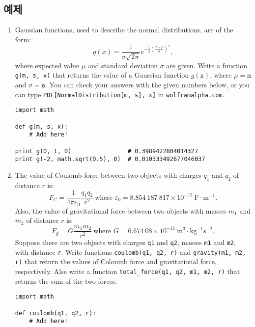\documentclass[../main.tex]{subfiles}
\begin{document}
\subsection{예제}
\begin{enumerate}
\item Gaussian functions, used to describe the normal distributions, are of the form:
\[
g(x) = \frac{1}{\sigma \sqrt{2\pi}} e^{-\frac12 \left(\frac{x - \mu}{\sigma}\right)^2},
\]
where expected value $\mu$ and standard deviation $\sigma$ are given.
Write a function \texttt{g(m, s, x)} that returns the value of a Gaussian function $g(\texttt{x})$, where $\mu = \texttt{m}$ and $\sigma = \texttt{s}$.
You can check your answers with the given numbers below, or you can type \texttt{PDF[NormalDistribution[m, s], x]} in \texttt{wolframalpha.com}.
\begin{verbatim}
import math

def g(m, s, x):
	# Add here!

print g(0, 1, 0)                # 0.3989422804014327
print g(-2, math.sqrt(0.5), 0)  # 0.010333492677046037
\end{verbatim}

\item The value of Coulomb force between two objects with charges $q_1$ and $q_2$ of distance $r$ is:
\[
F_C = \frac{1}{4\pi \varepsilon_0} \frac{q_1 q_2}{r^2}\ \text{where $\varepsilon_0 = 8.854\ 187\ 817 \times 10^{-12}\ \mathrm{F \cdot m^{-1}}$}.
\]
Also, the value of gravitational force between two objects with masses $m_1$ and $m_2$ of distance $r$ is:
\[
F_g = G \frac{m_1 m_2}{r^2}\ \text{where $G = 6.674\ 08 \times 10^{-11}\ \mathrm{m^3 \cdot kg^{-1} s^{-2}}$}.
\]
Suppose there are two objects with charges \texttt{q1} and \texttt{q2}, masses \texttt{m1} and \texttt{m2}, with distance \texttt{r}.
Write functions \texttt{coulomb(q1, q2, r)} and \texttt{gravity(m1, m2, r)} that return the values of Coloumb force and gravitational force, respectively.
Alse write a function \texttt{total\_force(q1, q2, m1, m2, r)} that returns the sum of the two forces.
\begin{verbatim}
import math

def coulomb(q1, q2, r):
	# Add here!


\end{verbatim}
\end{enumerate}
\end{document}
